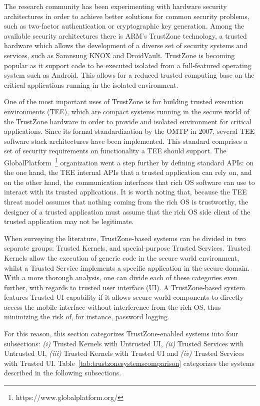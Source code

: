 The research community has been experimenting with hardware security architectures in order to achieve better solutions for common security problems, such as two-factor authentication or cryptographic key generation. Among the available security architectures there is ARM's TrustZone technology, a trusted hardware which allows the development of a diverse set of security systems and services, such as Samnsung KNOX and DroidVault. TrustZone is becoming popular as it support code to be executed isolated from a full-featured operating system such as Android. This allows for a reduced trusted computing base on the critical applications running in the isolated environment.

One of the most important uses of TrustZone is for building trusted execution environments (TEE), which are compact systems running in the secure world of the TrustZone hardware in order to provide and isolated environment for critical applications. Since its formal standardization by the OMTP in 2007, several \ac{TEE} software stack architectures have been implemented. This standard comprises a set of security requirements on functionality a TEE should support. The GlobalPlatform~\footnote{https://www.globalplatform.org/} organization went a step further by defining standard APIs: on the one hand, the TEE internal APIs that a trusted application can rely on, and on the other hand, the communication interfaces that rich OS software can use to interact with its trusted applications. It is worth noting that, because the TEE threat model assumes that nothing coming from the rich OS is trustworthy, the designer of a trusted application must assume that the rich OS side client of the trusted application may not be legitimate.

When surveying the literature, TrustZone-based systems can be divided in two separate groups: Trusted Kernels, and special-purpose Trusted Services. Trusted Kernels allow the execution of generic code in the secure world environment, whilst a Trusted Service implements a specific application in the secure domain. With a more thorough analysis, one can divide each of these categories even further, with regards to trusted user interface (UI). A TrustZone-based system features Trusted UI capability if it allows secure world components to directly access the mobile interface without interference from the rich OS, thus minimizing the risk of, for instance, password logging.

For this reason, this section categorizes TrustZone-enabled systems into four subsections: \emph{(i)} Trusted Kernels with Untrusted UI, \emph{(ii)} Trusted Services with Untrusted UI, \emph{(iii)} Trusted Kernels with Trusted UI and \emph{(iv)} Trusted Services with Trusted UI. Table~\ref{tab:trustzonesystemscomparison} categorizes the systems described in the following subsections.


